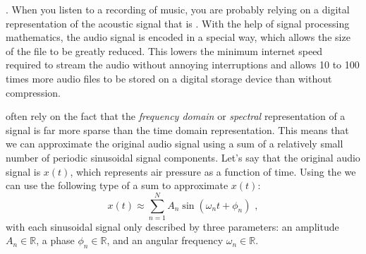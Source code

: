 . When you
listen to a recording of music, you are probably relying on a digital
representation of the acoustic signal that
is \emph{}. With the help of signal
processing mathematics, the audio signal is encoded in a special way,
which allows the size of the file to be greatly reduced. This lowers
the minimum internet speed required to stream the audio without
annoying interruptions and allows 10 to 100 times more audio files to
be stored on a digital storage device than without compression.

often rely on the fact that the \emph{frequency domain}
or \emph{spectral} representation of a signal is far more sparse than
the time domain representation. This means that we can approximate the
original audio signal using a sum of a relatively small number of
periodic sinusoidal signal components. Let's say that the original
audio signal is $x(t)$, which represents air pressure as a function of
time. Using the  we can use the
following type of a sum to approximate $x(t)$:
\begin{equation}
x(t) \approx \sum_{n=1}^{N} A_n \sin(\omega_n t + \phi_n) \,\,,
\label{ch01:eq:fourier_ser}
\end{equation}
with each sinusoidal signal only described by three parameters: an
amplitude $A_n \in \mathbb{R}$, a phase $\phi_n \in \mathbb{R}$, and an angular frequency $\omega_n \in \mathbb{R}$.

